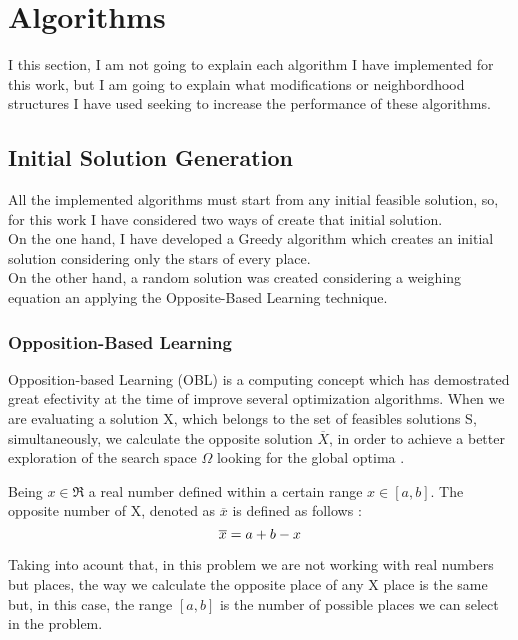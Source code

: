 \documentclass[preprint,14pt]{elsarticle}
\begin{document}
\section{Algorithms}
\label{S:algorithms}
I this section, I am not going to explain each algorithm I have implemented for this work, but I am going to explain what modifications or neighbordhood structures I have used seeking to increase the performance of these algorithms.
\subsection{Initial Solution Generation}
All the implemented algorithms must start from any initial feasible solution, so, for this work I have considered two ways of create that initial solution. \\
On the one hand, I have developed a Greedy algorithm which creates an initial solution considering only the stars of every place. \\
On the other hand, a random solution was created considering a weighing equation \label{eq:w} an applying the Opposite-Based Learning technique.
\label{S:random}
\subsubsection{Opposition-Based Learning}
\label{ss:OBL}
Opposition-based Learning (OBL) \cite{marrero,obl, obl2} is a computing concept which has demostrated great efectivity at the time of improve several optimization algorithms. When we are evaluating a solution X, which belongs to the set of feasibles solutions S, simultaneously, we calculate the opposite solution $\overline{X}$, in order to achieve a better exploration of the search space $\Omega$ looking for the global optima  \cite{obl}.

Being $x \in \Re $ a real number defined within a certain range $x \in [a,b]$. The opposite number of X, denoted as $\overline{x}$ is defined as follows \cite{obl,marrero}: \\
\begin{equation}\label{eq:w}
     \overline{x} = a + b - x  \\
 \end{equation}

 Taking into acount that, in this problem we are not working with real numbers but places, the way we calculate the opposite place of any X place is the same but, in this case, the range $[a, b]$ is the number of possible places we can select in the problem.
\end{document}
